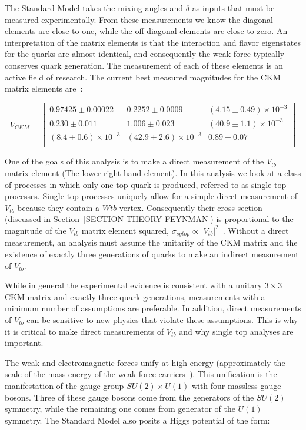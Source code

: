 The Standard Model takes the mixing angles and $\delta$ as inputs that must be measured experimentally. From these measurements we know the diagonal elements are close to one, while the off-diagonal elements are close to zero. An interpretation of the matrix elements is that the interaction and flavor eigenstates for the quarks are almost identical, and consequently the weak force typically conserves quark generation. The measurement of each of these elements is an active field of research. The current best measured magnitudes for the CKM matrix elements are~\cite{PDG}:

\begin{equation}\label{EQUATION-THEORY-CKMMATRIXEXP}
V_{CKM} = \begin{bmatrix} 0.97425\pm 0.00022 & 0.2252\pm 0.0009 & (4.15\pm 0.49) \times 10^{-3}\\ 0.230\pm 0.011& 1.006 \pm 0.023 & (40.9 \pm 1.1)\times 10^{-3}\\(8.4 \pm 0.6) \times 10^{-3}& (42.9 \pm 2.6) \times 10^{-3}& 0.89 \pm 0.07\\\end{bmatrix}
\end{equation}

One of the goals of this analysis is to make a direct measurement of the $V_{tb}$ matrix element (The lower right hand element). In this analysis we look at a class of processes in which only one top quark is produced, referred to as single top processes. Single top processes uniquely allow for a simple direct measurement of $V_{tb}$ because they contain a $Wtb$ vertex. Consequently their cross-section (discussed in Section~\ref{SECTION-THEORY-FEYNMAN}) is proportional to the magnitude of the $V_{tb}$ matrix element squared, $\sigma_{sgtop}\propto \left|V_{tb}\right|^2$~\cite{sgtopvtb}. Without a direct measurement, an analysis must assume the unitarity of the CKM matrix and the existence of exactly three generations of quarks to make an indirect measurement of $V_{tb}$. 

While in general the experimental evidence is consistent with a unitary $3 \times 3$ CKM matrix and exactly three quark generations, measurements with a minimum number of assumptions are preferable. In addition, direct measurements of $V_{tb}$ can be sensitive to new physics that violate these assumptions. This is why it is critical to make direct measurements of $V_{tb}$ and why single top analyses are important.

The weak and electromagnetic forces unify at high energy (approximately the scale of the mass energy of the weak force carriers~\cite{PDG}). This unification is the manifestation of the gauge group $SU(2) \times U(1)$ with four massless gauge bosons. Three of these gauge bosons come from the generators of the $SU(2)$ symmetry, while the remaining one comes from generator of the $U(1)$ symmetry. The Standard Model also posits a Higgs potential of the form:

